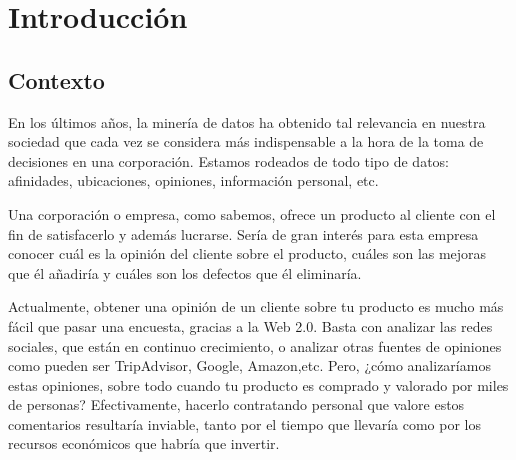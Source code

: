 \documentclass{article}
\begin{document}
\maketitle



\newpage
\tableofcontents
\newpage


\section{Introducción}

	\subsection{Contexto}
	En los últimos años, la minería de datos ha obtenido tal relevancia en nuestra sociedad que cada vez se considera más indispensable a la hora de la toma de decisiones en una corporación. Estamos rodeados de todo tipo de datos: afinidades, ubicaciones, opiniones, información personal, etc.
	
	Una corporación o empresa, como sabemos, ofrece un producto al cliente con el fin de satisfacerlo y además lucrarse. Sería de gran interés para esta empresa conocer cuál es la opinión del cliente sobre el producto, cuáles son las mejoras que él añadiría y cuáles son los defectos que él eliminaría. 
	
	Actualmente, obtener una opinión de un cliente sobre tu producto es mucho más fácil que pasar una encuesta, gracias a la Web 2.0. Basta con analizar las redes sociales, que están en continuo crecimiento, o analizar otras fuentes de opiniones como pueden ser TripAdvisor, Google, Amazon,etc. Pero, ¿cómo analizaríamos estas opiniones, sobre todo cuando tu producto es comprado y valorado por miles de personas? Efectivamente, hacerlo contratando personal que valore estos comentarios resultaría inviable, tanto por el tiempo que llevaría como por los recursos económicos que habría que invertir.
	
\end{document}
